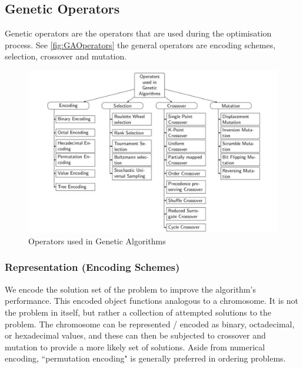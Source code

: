 
\subsection{Genetic Operators}\label{sec:geneticoperators}
Genetic operators are the operators that are used during the optimisation process. See \autoref{fig:GAOperators} the general operators are encoding schemes, selection, crossover and mutation. 

\begin{figure}[H]
    \centering
    \includegraphics[scale=0.4]{images/GA_Operators.png}
    \caption{Operators used in Genetic Algorithms \citep{Katoch2021}}
    \label{fig:GAOperators}
\end{figure}

\subsubsection{Representation (Encoding Schemes)}
We encode the solution set of the problem to improve the algorithm's performance. This encoded object functions analogous to a chromosome. It is not the problem in itself, but rather a collection of attempted solutions to the problem. The chromosome can be represented / encoded as binary, octadecimal, or hexadecimal values, and these can then be subjected to crossover and mutation to provide a more likely set of solutions. Aside from numerical encoding, ``permutation encoding" is generally preferred in ordering problems.

